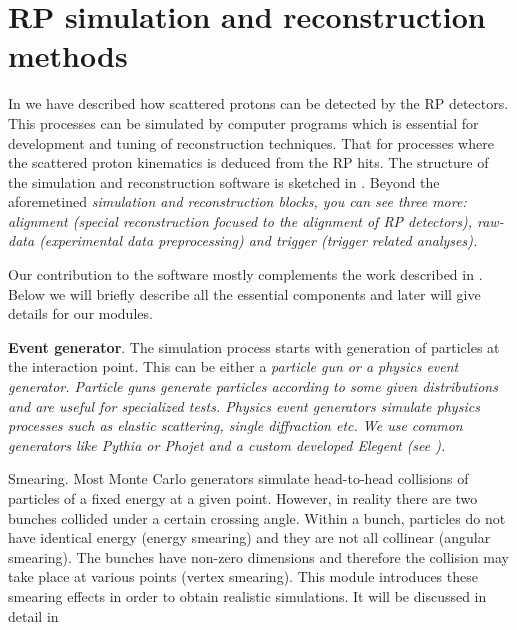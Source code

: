\iffalse
RP, MC, IP5, CMS, T1, T2, VFAT, DIGI, RECO, LAB, LHC, LS, DPE, MC, TOTEM, RMS, ndf
\fi


\chapter{RP simulation and reconstruction methods}



In  we have described how scattered protons can be detected by the RP detectors. This processes can be simulated by computer programs which is essential for development and tuning of reconstruction techniques. That for processes where the scattered proton kinematics is deduced from the RP hits. The structure of the simulation and reconstruction software is sketched in . Beyond the aforemetined \em{simulation} and \em{reconstruction} blocks, you can see three more: \em{alignment} (special reconstruction focused to the alignment of RP detectors), \em{raw-data} (experimental data preprocessing) and \em{trigger} (trigger related analyses).

Our contribution to the software mostly complements the work described in . Below we will briefly describe all the essential components and later will give details for our modules.

\> {\bf Event generator}.
The simulation process starts with generation of particles at the interaction point. This can be either a \em{particle gun} or a \em{physics event generator}. Particle guns generate particles according to some given distributions and are useful for specialized tests. Physics event generators simulate physics processes such as elastic scattering, single diffraction etc. We use common generators like Pythia  or Phojet  and a custom developed Elegent (see ).

\> Smearing.
Most Monte Carlo generators simulate head-to-head collisions of particles of a fixed energy at a given point. However, in reality there are two bunches collided under a certain crossing angle. Within a bunch, particles do not have identical energy (energy smearing) and they are not all collinear (angular smearing). The bunches have non-zero dimensions and therefore the collision may take place at various points (vertex smearing). This module introduces these smearing effects in order to obtain realistic simulations. It will be discussed in detail in 

